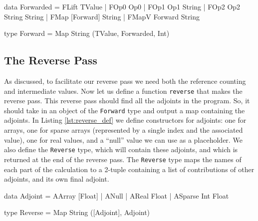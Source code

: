     \begin{haskell}[caption=Forward pass data structures, label=lst:forward, gobble=8]
        data Forwarded
            = FLift TValue
            | FOp0  Op0
            | FOp1  Op1       String
            | FOp2  Op2       String String
            | FMap  [Forward] String
            | FMapV Forward   String

        type Forward = Map String (TValue, Forwarded, Int)
    \end{haskell}

    \subsection{The Reverse Pass}
        As discussed, to facilitate our reverse pass we need both the reference counting and intermediate values.
        Now let us define a function \texttt{reverse} that makes the reverse pass.
        This reverse pass should find all the adjoints in the program.
        So, it should take in an object of the \texttt{Forward} type and output a map containing the adjoints.
        In Listing \ref{lst:reverse_def} we define constructors for adjoints: one for arrays, one for sparse arrays (represented by a single index and the associated value), one for real values, and a ``null'' value we can use as a placeholder.
        We also define the \texttt{Reverse} type, which will contain these adjoints, and which is returned at the end of the reverse pass.
        The \texttt{Reverse} type maps the names of each part of the calculation to a 2-tuple containing a list of contributions of other adjoints, and its own final adjoint.

        \begin{haskell}[caption=Definition of the \texttt{Reverse} type, label=lst:reverse_def, gobble=12]
            data Adjoint
                = AArray  [Float]
                | ANull
                | AReal   Float
                | ASparse Int Float

            type Reverse = Map String ([Adjoint], Adjoint)
        \end{haskell}

